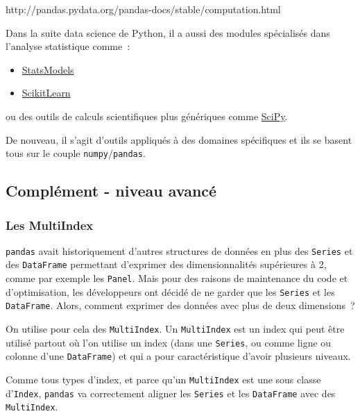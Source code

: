 http://pandas.pydata.org/pandas-docs/stable/computation.html

Dans la suite data science de Python, il a aussi des modules spécialisés
dans l'analyse statistique comme~:

\begin{itemize}
\tightlist
\item
  \href{http://www.statsmodels.org/stable/index.html}{StatsModels}
\item
  \href{http://scikit-learn.org/stable/}{ScikitLearn}
\end{itemize}

ou des outils de calculs scientifiques plus génériques comme
\href{https://www.scipy.org/}{SciPy}.

De nouveau, il s'agit d'outils appliqués à des domaines spécifiques et
ils se basent tous sur le couple \texttt{numpy}/\texttt{pandas}.

    \hypertarget{compluxe9ment---niveau-avancuxe9}{%
\subsection{Complément - niveau
avancé}\label{compluxe9ment---niveau-avancuxe9}}

    \hypertarget{les-multiindex}{%
\subsubsection{Les MultiIndex}\label{les-multiindex}}

    \texttt{pandas} avait historiquement d'autres structures de données en
plus des \texttt{Series} et des \texttt{DataFrame} permettant d'exprimer
des dimensionnalités supérieures à 2, comme par exemple les
\texttt{Panel}. Mais pour des raisons de maintenance du code et
d'optimisation, les développeurs ont décidé de ne garder que les
\texttt{Series} et les \texttt{DataFrame}. Alors, comment exprimer des
données avec plus de deux dimensions~?

On utilise pour cela des \texttt{MultiIndex}. Un \texttt{MultiIndex} est
un index qui peut être utilisé partout où l'on utilise un index (dans
une \texttt{Series}, ou comme ligne ou colonne d'une \texttt{DataFrame})
et qui a pour caractéristique d'avoir plusieurs niveaux.

Comme tous types d'index, et parce qu'un \texttt{MultiIndex} est une
sous classe d'\texttt{Index}, \texttt{pandas} va correctement aligner
les \texttt{Series} et les \texttt{DataFrame} avec des
\texttt{MultiIndex}.

